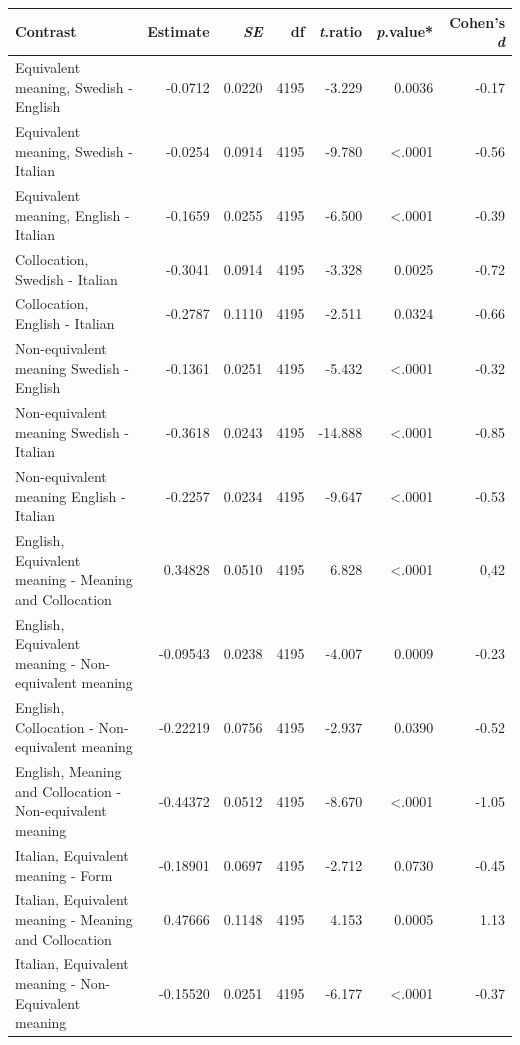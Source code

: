 \documentclass[output=paper,colorlinks,citecolor=brown,nonflat]{langsci/langscibook}
\begin{document}
\begin{table}
\footnotesize
    \begin{tabularx}{\textwidth}{Qrrrrrr}
    \lsptoprule
         Contrast & Estimate & ~\textit{SE} & df & \textit{t}.ratio & \textit{p}.value* & Cohen’s \textit{d}\\
    \midrule
        Equivalent meaning, Swedish -English & {}-0.0712 & 0.0220 & 4195 & {}-3.229 & 0.0036 & {}-0.17\\
        Equivalent meaning, Swedish -Italian & {}-0.0254 & 0.0914 & 4195 & {}-9.780 & <.0001 & {}-0.56\\
        Equivalent meaning, English -Italian & {}-0.1659 & 0.0255 & 4195 & {}-6.500 & <.0001 & {}-0.39\\
        \tablevspace
        Collocation, Swedish - Italian & {}-0.3041 & 0.0914 & 4195 & {}-3.328 & 0.0025 & {}-0.72\\
        Collocation, English - Italian & {}-0.2787 & 0.1110 & 4195 & {}-2.511 & 0.0324 & {}-0.66\\
        \tablevspace
        Non-equivalent meaning Swedish - English & {}-0.1361 & 0.0251 & 4195 & {}-5.432 & <.0001 & {}-0.32\\
        Non-equivalent meaning Swedish - Italian & {}-0.3618 & 0.0243 & 4195 & {}-14.888 & <.0001 & {}-0.85\\
        Non-equivalent meaning English - Italian & {}-0.2257 & 0.0234 & 4195 & {}-9.647 & <.0001 & {}-0.53\\
        \tablevspace
        English, Equivalent meaning - Meaning and Collocation & 0.34828 & 0.0510 & 4195 & 6.828 & <.0001 & 0,42\\
        English, Equivalent meaning - Non-equivalent meaning & {}-0.09543 & 0.0238 & 4195 & {}-4.007 & 0.0009 & {}-0.23\\
        English, Collocation -  Non-equivalent meaning & {}-0.22219 & 0.0756 & 4195 & {}-2.937 & 0.0390 & {}-0.52\\
        English, Meaning and Collocation - Non-equivalent meaning & {}-0.44372 & 0.0512 & 4195 & {}-8.670 & <.0001 & {}-1.05\\
        \tablevspace
        Italian, Equivalent meaning - Form & {}-0.18901 & 0.0697 & 4195 & {}-2.712 & 0.0730 & {}-0.45\\
        Italian, Equivalent meaning - Meaning and Collocation & 0.47666 & 0.1148 & 4195 & 4.153 & 0.0005 & 1.13\\
        Italian, Equivalent meaning - Non-Equivalent meaning & {}-0.15520 & 0.0251 & 4195 & {}-6.177 & <.0001 & {}-0.37\\

\end{tabularx}
\end{table}
\end{document}
